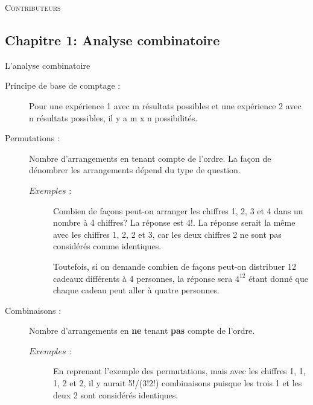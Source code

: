 \documentclass[10pt, french]{article}
\begin{document}
\begin{center}
	\textsc{\Large Contributeurs}\\[0.5cm] 
\end{center}


\newpage

\raggedcolumns
\begin{multicols*}{3}

\section{Chapitre 1: Analyse combinatoire}
\begin{probch1}{L'analyse combinatoire}
\begin{description}
  \item[Principe de base de comptage :] Pour une expérience 1 avec m résultats possibles et une expérience 2 avec n résultats possibles, il y a m x n possibilités.
\end{description}
\begin{description}
  \item[Permutations :] Nombre d'arrangements en tenant compte de l'ordre. La façon de dénombrer les arrangements dépend du type de question.
  \begin{description}
	\item[$Exemples$ :] Combien de façons peut-on arranger les chiffres 1, 2, 3 et 4 dans un nombre à 4 chiffres? La réponse est {4!}. La réponse serait la même avec les chiffres 1, 2, 2 et 3, car les deux chiffres 2 ne sont pas considérés comme identiques. 
	\item[] Toutefois, si on demande combien de façons peut-on distribuer 12 cadeaux différents à 4 personnes, la réponse sera $ 4^{12} $ étant donné que chaque cadeau peut aller à quatre personnes.
	\end{description}
\end{description}
\begin{description}
	\item[Combinaisons :] Nombre d'arrangements en \textbf{ne} tenant \textbf{pas} compte de l'ordre.
	\begin{description}
	 \item[$Exemples$ :] En reprenant l'exemple des permutations, mais avec les chiffres 1, 1, 1, 2 et 2, il y aurait 5!/(3!2!) combinaisons puisque les trois 1 et les deux 2 sont considérés identiques.
	 \end{description}
\end{description}

\end{probch1}
\end{multicols*}
\end{document}
